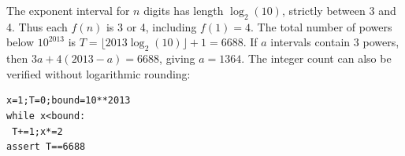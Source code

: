 The exponent interval for $ n $ digits has length $\log_2(10)$, strictly between 3 and 4. Thus each $ f(n)$ is 3 or 4, including $ f(1)=4 $. The total number of powers below $ 10^{2013}$ is $ T=\lfloor2013\log_2(10)\rfloor+1=6688 $. If $ a $ intervals contain 3 powers, then $ 3a+4(2013-a)=6688 $, giving $\boxed{a=1364}$. The integer count can also be verified without logarithmic rounding:
\begin{verbatim}
x=1;T=0;bound=10**2013
while x<bound:
 T+=1;x*=2
assert T==6688
\end{verbatim}
